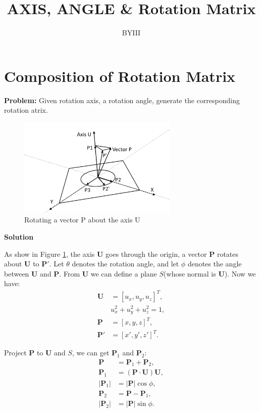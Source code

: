 \documentclass{article}
\begin{document}
\author{BYIII}
\title{AXIS, ANGLE \& Rotation Matrix}
\date{}

\maketitle

\section{Composition of Rotation Matrix}
\textbf{Problem:} Given rotation axis, a rotation angle, generate the corresponding rotation atrix.

\begin{figure}[!h]
\centering
\includegraphics[width=3in]{figures/axis_angle_rot3.png}
\caption{Rotating a vector P about the axis U}
\label{fig1}
\end{figure}

\noindent\textbf{Solution}


As show in Figure \ref{fig1}, the axis \textbf{U} goes through the origin, a vector \textbf{P} rotates about \textbf{U} to $\mathbf{P}'$. Let $\theta$ denotes the rotation angle, and let $\phi$ denotes the angle between \textbf{U} and \textbf{P}. From \textbf{U} we can define a plane $S$(whose normal is \textbf{U}). Now we have: 
\begin{displaymath}
\begin{split}
\mathbf{U} &= [u_x, u_y, u_z]^T, \\
&  u_x^2+u_y^2+u_z^2 = 1, \\
\mathbf{P} &= [x, y, z]^T, \\
\mathbf{P}' &= [x', y', z']^T.
\end{split}
\end{displaymath}

Project \textbf{P} to \textbf{U} and $S$, we can get $\mathbf{P}_1$ and $\mathbf{P}_2$:
\begin{displaymath}
\begin{split}
\mathbf{P} &= \mathbf{P}_1+\mathbf{P}_2, \\
\mathbf{P}_1 &= (\mathbf{P}\cdot\mathbf{U})\mathbf{U}, \\
|\mathbf{P}_1| &=  |\mathbf{P}|\cos{\phi}, \\
\mathbf{P}_2 &= \mathbf{P} - \mathbf{P}_1, \\
|\mathbf{P}_2| &=  |\mathbf{P}|\sin{\phi}.
\end{split}
\end{displaymath}
\end{document}
